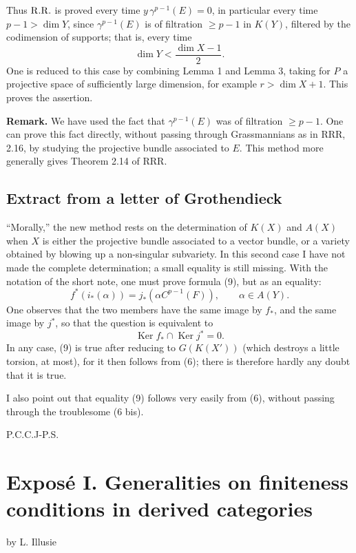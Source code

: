 \documentclass[11pt]{article}
\newcommand{\RRR}{\mathrm{RRR}}
\providecommand{\Ker}{\operatorname{Ker}}
\begin{document}
Thus \(\mathrm{R.R.}\) is proved every time \(y\,\gamma^{p-1}(E)=0\), in particular every time \(p-1>\dim Y\), since \(\gamma^{p-1}(E)\) is of filtration \(\geq p-1\) in \(K(Y)\), filtered by the codimension of supports; that is, every time
\[
  \dim Y < \frac{\dim X-1}{2}.
\]
One is reduced to this case by combining Lemma 1 and Lemma 3, taking for \(P\) a projective space of sufficiently large dimension, for example \(r>\dim X+1\). This proves the assertion.

\textbf{Remark.} We have used the fact that \(\gamma^{p-1}(E)\) was of filtration \(\geq p-1\). One can prove this fact directly, without passing through Grassmannians as in \(\RRR\), 2.16, by studying the projective bundle associated to \(E\). This method more generally gives Theorem 2.14 of \(\RRR\).

\subsection*{Extract from a letter of Grothendieck}
``Morally,'' the new method rests on the determination of \(K(X)\) and \(A(X)\) when \(X\) is either the projective bundle associated to a vector bundle, or a variety obtained by blowing up a non-singular subvariety. In this second case I have not made the complete determination; a small equality is still missing. With the notation of the short note, one must prove formula (9), but as an equality:
\begin{equation}\tag{9}
  f^*(i_*(\alpha))=j_*(\alpha C^{p-1}(F)),\qquad \alpha\in A(Y).
\end{equation}
One observes that the two members have the same image by \(f_*\), and the same image by \(j^*\), so that the question is equivalent to
\begin{equation}\tag{9 bis}
  \Ker f_*\cap\Ker j^*=0.
\end{equation}
In any case, (9) is true after reducing to \(G(K(X'))\) (which destroys a little torsion, at most), for it then follows from (6); there is therefore hardly any doubt that it is true.

I also point out that equality (9) follows very easily from (6), without passing through the troublesome (6 bis).

\begin{flushleft}
P.C.C.J-P.S.
\end{flushleft}

\newpage
\section*{Exposé I. Generalities on finiteness conditions in derived categories}
\begin{center}
by L. Illusie
\end{center}
\end{document}
